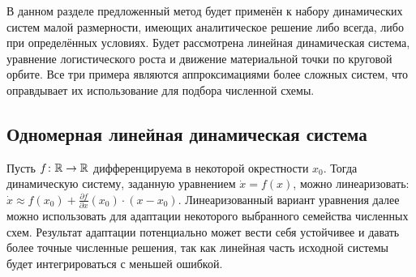 В данном разделе предложенный метод будет применён к набору динамических систем малой размерности,
имеющих аналитическое решение либо всегда, либо при определённых условиях.
Будет рассмотрена линейная динамическая система,
уравнение логистического роста и движение материальной точки по круговой орбите.
Все три примера являются аппроксимациями более сложных систем,
что оправдывает их использование для подбора численной схемы.

\subsection{Одномерная линейная динамическая система}
\label{subsection:methods:one_dimensional_linear_system}

Пусть $ f \colon \mathbb{R} \to \mathbb{R} $ дифференцируема в некоторой окрестности $ x_0 $.
Тогда динамическую систему, заданную уравнением $ \dot x = f(x) $,
можно линеаризовать: $ \dot x \approx f(x_0) + \frac{\partial f}{\partial x}(x_0) \cdot (x - x_0) $.
Линеаризованный вариант уравнения далее можно использовать для адаптации некоторого выбранного семейства численных схем.
Результат адаптации потенциально может вести себя устойчивее и давать более точные численные решения,
так как линейная часть исходной системы будет интегрироваться с меньшей ошибкой.

